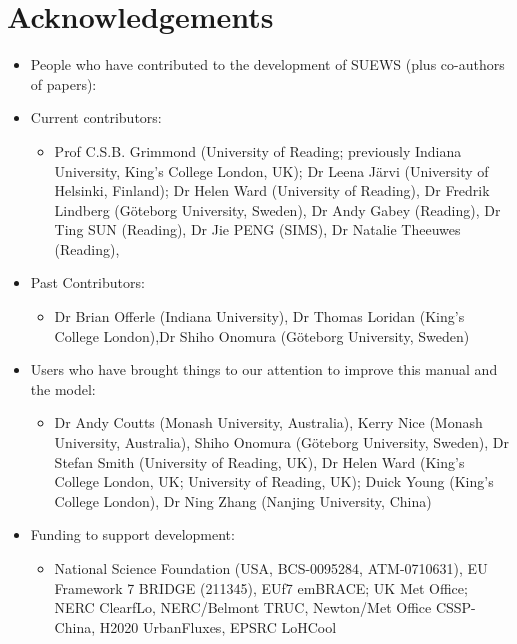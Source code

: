 \documentclass[letterpaper,10pt,english]{sphinxmanual}
\begin{document}


\chapter{Acknowledgements}
\label{\detokenize{acknowledgement:acknowledgements}}\label{\detokenize{acknowledgement::doc}}\begin{itemize}
\item {} 
People who have contributed to the development of SUEWS (plus
co-authors of papers):

\item {} 
Current contributors:
\begin{itemize}
\item {} 
Prof C.S.B. Grimmond (University of Reading; previously Indiana
University, King’s College London, UK); Dr Leena Järvi (University
of Helsinki, Finland); Dr Helen Ward (University of Reading), Dr
Fredrik Lindberg (Göteborg University, Sweden), Dr Andy Gabey
(Reading), Dr Ting SUN (Reading), Dr Jie PENG (SIMS), Dr Natalie
Theeuwes (Reading),

\end{itemize}

\item {} 
Past Contributors:
\begin{itemize}
\item {} 
Dr Brian Offerle (Indiana University), Dr Thomas Loridan (King’s
College London),Dr Shiho Onomura (Göteborg University, Sweden)

\end{itemize}

\item {} 
Users who have brought things to our attention to improve this manual
and the model:
\begin{itemize}
\item {} 
Dr Andy Coutts (Monash University, Australia), Kerry Nice (Monash
University, Australia), Shiho Onomura (Göteborg University,
Sweden), Dr Stefan Smith (University of Reading, UK), Dr Helen
Ward (King’s College London, UK; University of Reading, UK); Duick
Young (King’s College London), Dr Ning Zhang (Nanjing University,
China)

\end{itemize}

\item {} 
Funding to support development:
\begin{itemize}
\item {} 
National Science Foundation (USA, BCS-0095284, ATM-0710631), EU
Framework 7 BRIDGE (211345), EUf7 emBRACE; UK Met Office; NERC
ClearfLo, NERC/Belmont TRUC, Newton/Met Office CSSP-China, H2020
UrbanFluxes, EPSRC LoHCool

\end{itemize}

\end{itemize}
\end{document}
